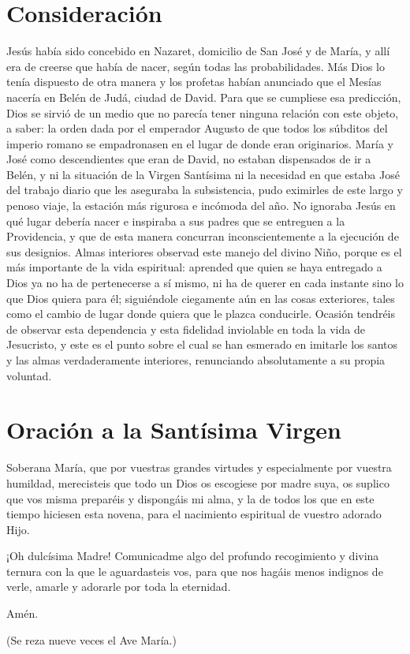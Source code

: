 \documentclass[spanish,utf8,12pt,twocolumn]{chlart}
\newenvironment{lectura}{\begingroup\color{lector}}{\endgroup\par}
\newenvironment{finalnotes}{\begingroup
	\footnotesize\sffamily\color{Gray}%
	\setlength{\leftskip}{3em}\setlength{\rightskip}{3em}\noindent
	}{\par\endgroup}
\begin{document}
\section{Consideración}
\begin{lectura}
Jesús había sido concebido en Nazaret, domicilio de San José y de María,
y allí era de creerse que había de nacer, según todas las probabilidades.
Más Dios lo tenía dispuesto de otra manera y los profetas habían
anunciado que el Mesías nacería en Belén de Judá, ciudad de David.
Para que se cumpliese esa predicción, Dios se sirvió de un medio que no
parecía tener ninguna relación con este objeto, a saber:
la orden dada por el emperador Augusto de que todos los súbditos del
imperio romano se empadronasen en el lugar de donde eran originarios.
María y José como descendientes que eran de David, no estaban
dispensados de ir a Belén, y ni la situación de la Virgen Santísima ni
la necesidad en que estaba José del trabajo diario que les aseguraba la
subsistencia, pudo eximirles de este largo y penoso viaje, la estación
más rigurosa e incómoda del año.
No ignoraba Jesús en qué lugar debería nacer e inspiraba a sus padres
que se entreguen a la Providencia, y que de esta manera concurran
inconscientemente a la ejecución de sus designios.
Almas interiores observad este manejo del divino Niño, porque es el más
importante de la vida espiritual:
aprended que quien se haya entregado a Dios ya no ha de pertenecerse a
sí mismo, ni ha de querer en cada instante sino lo que Dios quiera para
él; siguiéndole ciegamente aún en las cosas exteriores, tales como el
cambio de lugar donde quiera que le plazca conducirle.
Ocasión tendréis de observar esta dependencia y esta fidelidad
inviolable en toda la vida de Jesucristo, y este es el punto sobre el
cual se han esmerado en imitarle los santos y las almas verdaderamente
interiores, renunciando absolutamente a su propia voluntad.
\end{lectura}

\section{Oración a la Santísima Virgen}
\begin{lectura}
Soberana María, que por vuestras grandes virtudes y especialmente por
vuestra humildad, merecisteis que todo un Dios os escogiese por madre
suya, os suplico que vos misma preparéis y dispongáis mi alma, y la de
todos los que en este tiempo hiciesen esta novena, para el nacimiento
espiritual de vuestro adorado Hijo.

¡Oh dulcísima Madre!
Comunicadme algo del profundo recogimiento y divina ternura con la que
le aguardasteis vos, para que nos hagáis menos indignos de verle, amarle
y adorarle por toda la eternidad.

Amén.
\end{lectura}
\begin{finalnotes}
(Se reza nueve veces el Ave María.)
\end{finalnotes}
\end{document}

